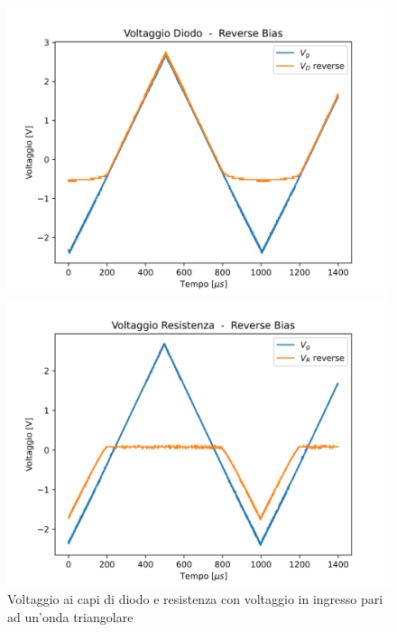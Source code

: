 \begin{figure}
\begin{minipage}{0.475\textwidth}
    \end{minipage}
    \begin{minipage}{0.475\textwidth}
        \includegraphics[width=1\textwidth]{Diodo 3.2.3/Triang_V_D_Reverse.png}
    \end{minipage}
    \hfill
    \begin{minipage}{0.475\textwidth}
        \includegraphics[width=1\textwidth]{Diodo 3.2.3/Triang_V_R_Reverse.png}
    \end{minipage}
    \caption{Voltaggio ai capi di diodo e resistenza con voltaggio in ingresso pari ad un'onda triangolare }
    \label{Triangular input}
\end{figure}
